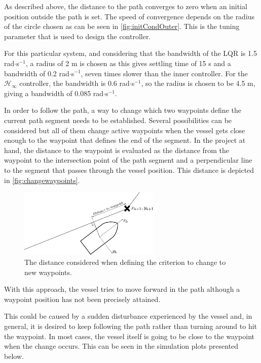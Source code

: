 As described above, the distance to the path converges to zero when an initial position outside the path is set. The speed of convergence depends on the radius of the circle chosen as can be seen in \autoref{fig:initCondOuter}. This is the tuning parameter that is used to design the controller.

For this particular system, and considering that the bandwidth of the LQR is \num{1.5} rad$\cdot$s$^{-1}$, a radius of \num{2} m is chosen as this gives settling time of 15 s and a bandwidth of \num{0.2} rad$\cdot$s$^{-1}$, seven times slower than the inner controller. For the $\mathcal{H}_\infty$ controller, the bandwidth is \num{0.6} rad$\cdot$s$^{-1}$, so the radius is chosen to be \num{4.5} m, giving a bandwidth of \num{0.085} rad$\cdot$s$^{-1}$.

In order to follow the path, a way to change which two waypoints define the current path segment needs to be established. Several possibilities can be considered but all of them change active waypoints when the vessel gets close enough to the waypoint that defines the end of the segment. In the project at hand, the distance to the waypoint is evaluated as the distance from the waypoint to the intersection point of the path segment and a perpendicular line to the segment that passes through the vessel position. This distance is depicted in \autoref{fig:changewaypoints}.
\begin{figure}[H]
	\includegraphics[width=0.6\textwidth]{figures/LOSalgorithmdistancewp}
	\caption{The distance considered when defining the criterion to change to new waypoints.}
	\label{fig:changewaypoints}
\end{figure}
With this approach, the vessel tries to move forward in the path although a waypoint position has not been precisely attained.

This could be caused by a sudden disturbance experienced by the vessel and, in general, it is desired to keep following the path rather than turning around to hit the waypoint. In most cases, the vessel itself is going to be close to the waypoint when the change occurs. This can be seen in the simulation plots presented below. 